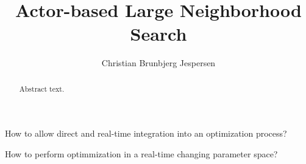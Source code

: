 \documentclass[preprint,12pt,authoryear]{elsarticle}
\begin{document}
\begin{frontmatter}



\title{Actor-based Large Neighborhood Search} %


\author{Christian Brunbjerg Jespersen} %


\begin{abstract}
Abstract text.
\end{abstract}

\begin{graphicalabstract}
\end{graphicalabstract}

\begin{highlights}
\item How to allow direct and real-time integration into an optimization process?
\item How to perform optimmization in a real-time changing parameter space?
\end{highlights}


\end{frontmatter}
\end{document}
